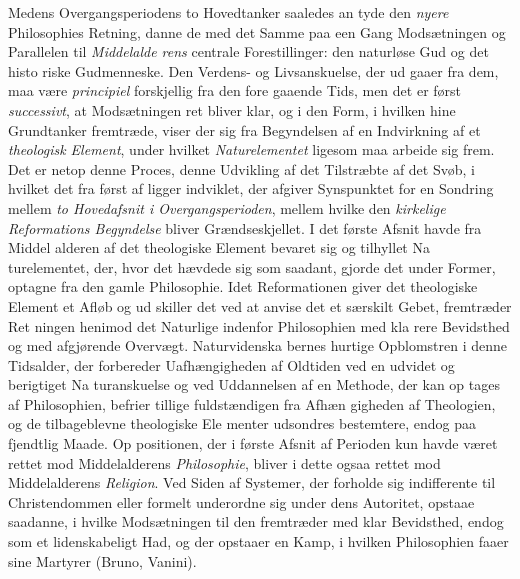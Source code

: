 Medens Overgangsperiodens to Hovedtanker saaledes an\-%
tyde den \emph{nyere} Philosophies Retning, danne de med det Samme
paa een Gang Modsætningen og Parallelen til \emph{Middelalde\-%
rens} centrale Forestillinger: den naturløse Gud og det histo\-%
riske Gudmenneske. Den Verdens- og Livsanskuelse, der ud\-%
gaaer fra dem, maa være \emph{principiel} forskjellig fra den fore\-%
gaaende Tids, men det er først \emph{successivt}, at Modsætningen
ret bliver klar, og i den Form, i hvilken hine Grundtanker
fremtræde, viser der sig fra Begyndelsen af en Indvirkning af
et \emph{theologisk Element}, under hvilket \emph{Naturelementet}
ligesom maa arbeide sig frem. Det er netop denne Proces,
denne Udvikling af det Tilstræbte af det Svøb, i hvilket det
fra først af ligger indviklet, der afgiver Synspunktet for en
Sondring mellem \emph{to Hovedafsnit i Overgangsperioden},
mellem hvilke den \emph{kirkelige Reformations Begyndelse}
bliver Grændseskjellet. I det første Afsnit havde fra Middel\-%
alderen af det theologiske Element bevaret sig og tilhyllet Na\-%
turelementet, der, hvor det hævdede sig som saadant, gjorde
det under Former, optagne fra den gamle Philosophie. Idet
Reformationen giver det theologiske Element et Afløb og ud\-%
skiller det ved at anvise det et særskilt Gebet, fremtræder Ret\-%
ningen henimod det Naturlige indenfor Philosophien med kla\-%
rere Bevidsthed og med afgjørende Overvægt. Naturvidenska\-%
bernes hurtige Opblomstren i denne Tidsalder, der forbereder
Uafhængigheden af Oldtiden ved en udvidet og berigtiget Na\-%
turanskuelse og ved Uddannelsen af en Methode, der kan op\-%
tages af Philosophien, befrier tillige fuldstændigen fra Afhæn\-%
gigheden af Theologien, og de tilbageblevne theologiske Ele\-%
menter udsondres bestemtere, endog paa fjendtlig Maade. Op\-%
positionen, der i første Afsnit af Perioden kun havde været
rettet mod Middelalderens \emph{Philosophie}, bliver i dette ogsaa
rettet mod Middelalderens \emph{Religion}. Ved Siden af Systemer,
der forholde sig indifferente til Christendommen eller formelt
underordne sig under dens Autoritet, opstaae saadanne, i hvilke
Modsætningen til den fremtræder med klar Bevidsthed, endog
som et lidenskabeligt Had, og der opstaaer en Kamp, i hvilken
Philosophien faaer sine Martyrer (Bruno, Vanini).

